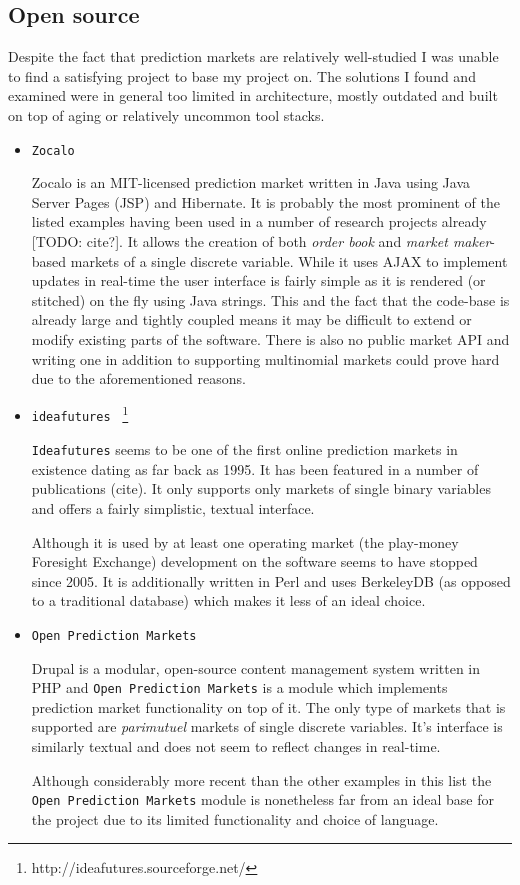 \documentclass[bsc,frontabs,twoside,singlespacing,parskip,deptreport]{infthesis}     %
\begin{document}
\subsection{Open source}
    Despite the fact that prediction markets are relatively well-studied I was unable to find a satisfying project to base my project on. The solutions I found and examined were in general too limited in architecture, mostly outdated and built on top of aging or relatively uncommon tool stacks. 

\begin{itemize}

\item {\tt Zocalo}

	Zocalo is an MIT-licensed prediction market written in Java using Java Server Pages (JSP) and Hibernate. It is probably the most prominent of the listed examples having been used in a number of research projects already [TODO: cite?]. It allows the creation of both {\em order book} and {\em market maker}-based markets of a single discrete variable. While it uses AJAX to implement updates in real-time the user interface is fairly simple as it is rendered (or stitched) on the fly using Java strings. This and the fact that the code-base is already large and tightly coupled means it may be difficult to extend or modify existing parts of the software. There is also no public market API and writing one in addition to supporting multinomial markets could prove hard due to the aforementioned reasons. 

\item {\tt ideafutures } \footnote{http://ideafutures.sourceforge.net/}

	{\tt Ideafutures} seems to be one of the first online prediction markets in existence dating as far back as 1995. It has been featured in a number of publications (cite). It only supports only markets of single binary variables and offers a fairly simplistic, textual interface. 

Although it is used by at least one operating market (the play-money Foresight Exchange) development on the software seems to have stopped since 2005. It is additionally written in Perl and uses BerkeleyDB (as opposed to a traditional database) which makes it less of an ideal choice. 

\item {\tt Open Prediction Markets} 

	Drupal is a modular, open-source content management system written in PHP and {\tt Open Prediction Markets} is a module which implements prediction market functionality on top of it. The only type of markets that is supported are {\em parimutuel} markets of single discrete variables. It's interface is similarly textual and does not seem to reflect changes in real-time. 
	
	Although considerably more recent than the other examples in this list the {\tt Open Prediction Markets} module is nonetheless far from an ideal base for the project due to its limited functionality and choice of language. 
	
\end{itemize}
\end{document}
